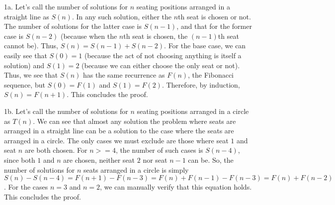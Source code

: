 \documentclass{article}
\begin{document}
1a. Let's call the number of solutions for $n$ seating positions arranged in a straight line as $S(n)$. In any such solution, either the $n$th seat is chosen or not. The number of solutions for the latter case is $S(n - 1)$, and that for the former case is $S(n - 2)$ (because when the $n$th seat is chosen, the $(n - 1)$th seat cannot be). Thus, $S(n) = S(n - 1) + S(n - 2)$. For the base case, we can easily see that $S(0) = 1$ (because the act of not choosing anything is itself a solution) and $S(1) = 2$ (because we can either choose the only seat or not). Thus, we see that $S(n)$ has the same recurrence as $F(n)$, the Fibonacci sequence, but $S(0) = F(1)$ and $S(1) = F(2)$. Therefore, by induction, $S(n) = F(n + 1)$. This concludes the proof.

1b. Let's call the number of solutions for $n$ seating positions arranged in a circle as $T(n)$. We can see that almost any solution the problem where seats are arranged in a straight line can be a solution to the case where the seats are arranged in a circle. The only cases we must exclude are those where seat $1$ and seat $n$ are both chosen. For $n >= 4$, the number of such cases is $S(n - 4)$, since both $1$ and $n$ are chosen, neither seat $2$ nor seat $n - 1$ can be. So, the number of solutions for $n$ seats arranged in a circle is simply $S(n) - S(n - 4) = F(n + 1) - F(n - 3) = F(n) + F(n - 1) - F(n - 3) = F(n) + F(n - 2)$. For the cases $n = 3$ and $n = 2$, we can manually verify that this equation holds. This concludes the proof.
\end{document}
